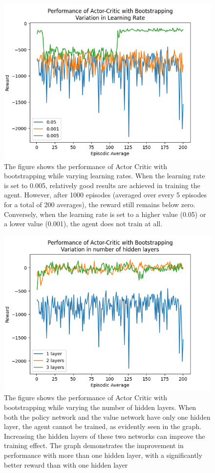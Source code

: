 \documentclass{article}
\begin{document}
\begin{figure}[h!]
    \centering
\includegraphics[width=0.9\linewidth]{Report/images/06.Performance_of_Actor_Critic_BS_LR.png}
\caption{\label{fig:ActorCritic for different learning rates}The figure shows the performance of Actor Critic with bootstrapping while varying learning rates. When the learning rate is set to 0.005, relatively good results are achieved in training the agent. However, after 1000 episodes (averaged over every 5 episodes for a total of 200 averages), the reward still remains below zero. Conversely, when the learning rate is set to a higher value (0.05) or a lower value (0.001), the agent does not train at all.}
\end{figure}

\begin{figure}[h!]
\centering
\includegraphics[width=0.9\linewidth]{Report/images/07.Performance_of_Actor_Critic_BS_Layers.png}
\caption{\label{fig:ActorCritic for different Hidden Layers}The figure shows the performance of Actor Critic with bootstrapping while varying the number of hidden layers. When both the policy network and the value network have only one hidden layer, the agent cannot be trained, as evidently seen in the graph. Increasing the hidden layers of these two networks can improve the training effect. The graph demonstrates the improvement in performance with more than one hidden layer, with a significantly better reward than with one hidden layer}
\end{figure}
\end{document}
